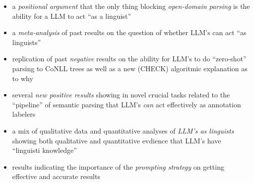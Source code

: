 \begin{itemize}
    \item a {\em positional argument} that the only thing blocking {\em open-domain parsing} is the ability for a LLM to act ``as a linguist''
    \item a {\em meta-analysis} of past results on the question of whether LLM's can act ``as linguists''
    \item replication of past {\em negative} results on the ability for LLM's to do ``zero-shot'' parsing to CoNLL trees as well as a new (CHECK) algoritmic explanation as to why
    \item several {\em new positive results} showing in novel crucial tasks related to the ``pipeline'' of semantic parsing that LLM's {\em can} act effectively as annotation labelers
    \item a mix of qualitative data and quantitative analyses of {\em LLM's as linguists} showing both qualitative and quantitative evdience that LLM's have ``linguisti knowledge''
    \item results indicating the importance of the {\em prompting strategy} on getting effective and accurate results
\end{itemize}